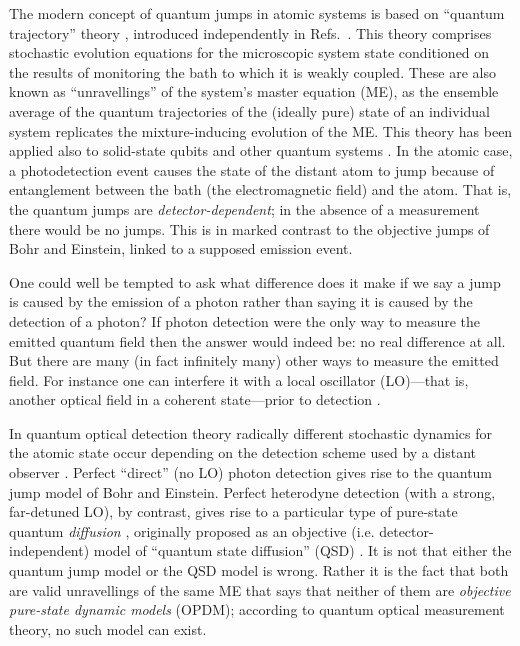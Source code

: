 \documentclass[12pt,prl,floatfix,showpacs,superscriptaddress,amsmath,amssymb]{revtex4}
\renewcommand{\(}{\left(}
\renewcommand{\)}{\right)}
\begin{document}
The modern concept of quantum jumps  in atomic systems  is based on ``quantum trajectory'' theory \cite{Car93b}, introduced independently in  Refs.~\cite{DalCasMol92,GarParZol92,Bar93}.  This theory comprises stochastic evolution equations for the microscopic system state conditioned on the results of monitoring the bath to which it is weakly coupled.  
These are also known as ``unravellings''   \cite{Car93b} of the system's master equation (ME), as the ensemble average  of the quantum trajectories of the (ideally pure) state of an individual system replicates the mixture-inducing evolution of the ME.  
This theory  
has been applied also to solid-state qubits and other quantum systems \cite{WisMil10,KorPRB99,Gambetta2008}. In the atomic case, a photodetection event causes the state of the distant atom to  jump  because of entanglement between the bath (the electromagnetic field) and the atom.  That is, the quantum jumps are 
{\em detector-dependent};  in the absence of a measurement there would be no jumps.  This is in marked contrast to the  objective  jumps of Bohr and Einstein,  linked to a supposed emission event. 

One could well be tempted to ask 
what difference does it make if we say a jump is caused 
by the emission of a photon rather than saying it is caused by the detection 
of a photon? 
If photon detection were the only way to measure the emitted quantum 
field then the answer %
would indeed be: no real difference at all. But there are many 
(in fact infinitely many) other ways to measure the emitted field. For instance one can  
interfere it with a local oscillator (LO)---that is, another optical field in a coherent state---prior 
to detection \cite{Car93b}. 

In quantum optical detection theory  
radically different stochastic dynamics for the atomic state occur depending on the detection 
scheme used by a distant observer \cite{Bar93,Car93b,WisMil10}. Perfect ``direct'' (no LO) photon detection gives rise to the quantum jump model of Bohr and Einstein. Perfect heterodyne detection (with a strong, far-detuned LO), by contrast, gives rise to a particular 
type of pure-state quantum {\em diffusion} \cite{WisMil93c}, originally proposed as an 
objective (i.e. detector-independent) model 
of ``quantum state diffusion'' (QSD) \cite{GisPer92b}.  It is not that either the quantum jump model or 
the QSD model is wrong. Rather it is the fact that both are 
valid unravellings of the same ME that says that neither of them are {\em objective pure-state dynamic models} (OPDM); 
according to quantum optical measurement theory, no such model can exist. 
\end{document}
